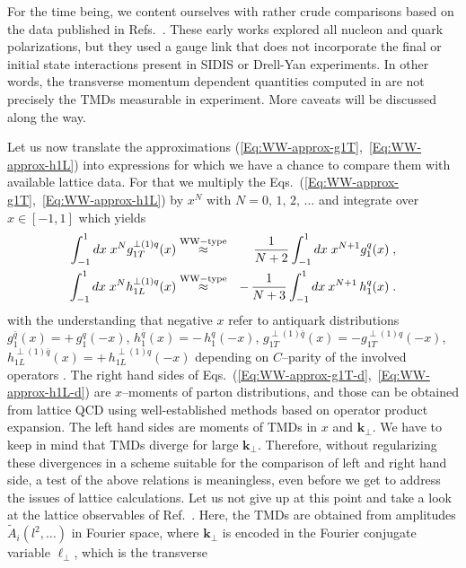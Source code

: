 \documentclass[a4paper,11pt]{article}
\newcommand{\ba}{\begin{eqnarray}}
\newcommand{\ea}{\end{eqnarray}}
\def\bflperp{{\bm \ell}_\perp}
\def\bfkperp{{\bm k}_\perp}
\begin{document}
For the time being, we content ourselves with rather crude comparisons 
based on the data published in Refs.~\cite{Hagler:2009mb,Musch:2010ka}. 
These early works explored all nucleon and quark polarizations, but 
they used a gauge link that does not incorporate the final or initial 
state interactions present in SIDIS or Drell-Yan experiments. In other 
words, the transverse momentum dependent quantities computed in
\cite{Hagler:2009mb,Musch:2010ka} are not precisely the TMDs measurable 
in experiment. More caveats will be discussed along the way.

Let us now translate the approximations
(\ref{Eq:WW-approx-g1T},~\ref{Eq:WW-approx-h1L}) into expressions
for which we have a chance to compare them with available lattice data.
For that we multiply the
Eqs.~(\ref{Eq:WW-approx-g1T},~\ref{Eq:WW-approx-h1L}) by $x^N$
with $N=0,\,1,\,2,\,\dots$ and integrate over $x\in[-1,1]$ which yields
\ba
        \int_{-1}^1 d x\;x^N
       g_{1T}^{\perp(1)q}(x)&\stackrel{\rm WW-type}{\approx}&
        \phantom{-} \,\frac{1}{N+2} \int_{-1}^1 d x \;x^{N+1}g_1^q(x)
        \;,
    \label{Eq:WW-approx-g1T-d}\\
        \int_{-1}^1 d x\;x^N
        h_{1L}^{\perp(1)q}(x)&\stackrel{\rm WW-type}{\approx}&
        -\,\frac{1}{N+3} \int_{-1}^1 d x\: x^{N+1}\,h_1^q(x)
        \;.
    \label{Eq:WW-approx-h1L-d}
\ea
with the understanding that
negative $x$ refer to antiquark distributions
$g_1^{\bar q}(x) = +\,g_1^{q}(-x)$,
$h_1^{\bar q}(x) = -\,h_1^{q}(-x)$,
$g_{1T}^{\perp(1)\bar q}(x) =- g_{1T}^{\perp(1)q}(-x)$,
$h_{1L}^{\perp(1)\bar q}(x) = +\,h_{1L}^{\perp(1)q}(-x)$
depending on $C$--parity of the involved operators \cite{Mulders:1995dh}.
The right hand sides of 
Eqs.~(\ref{Eq:WW-approx-g1T-d},~\ref{Eq:WW-approx-h1L-d}) are $x$--moments 
of parton distributions, and those can be obtained from lattice QCD using 
well-established methods based on operator product expansion. 
The left hand sides are moments of TMDs in $x$ and $\bfkperp$. We have to 
keep in mind that TMDs diverge for large $\bfkperp$. Therefore, without 
regularizing these divergences in a scheme suitable for the comparison of 
left and right hand side, a test of the above relations is meaningless, 
even before we get to address the issues of lattice calculations. Let us 
not give up at this point and take a look at the lattice observables of 
Ref.~\cite{Musch:2010ka}. Here, the TMDs are obtained from amplitudes 
$\tilde A_i(l^2,\ldots)$ in Fourier space, where $\bfkperp$ is encoded 
in the Fourier conjugate variable $\bflperp$, which is the transverse 
\end{document}
